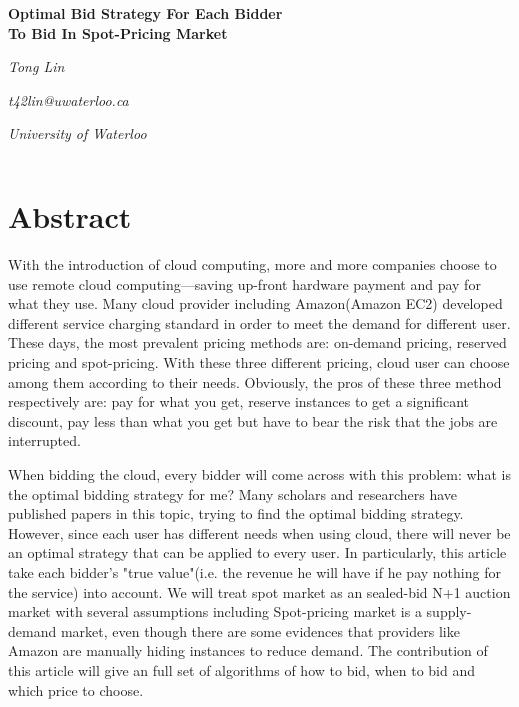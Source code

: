 \documentclass[11pt]{article}
\begin{document}
\begin{center}

{\large\bf Optimal Bid Strategy For Each Bidder\\ To Bid In Spot-Pricing Market}

\vspace{12pt}

{\em Tong Lin}

{\em t42lin@uwaterloo.ca}

{\em University of Waterloo}
\end{center}

$\ $

\section{Abstract}

With the introduction of cloud computing, more and more companies choose to use remote cloud computing---saving up-front hardware payment and pay for what they use. Many cloud provider including Amazon(Amazon EC2) developed different service charging standard in order to meet the demand for different user. These days, the most prevalent pricing methods are: on-demand pricing, reserved pricing and spot-pricing. With these three different pricing, cloud user can choose among them according to their needs. Obviously, the pros of these three method respectively are: pay for what you get, reserve instances to get a significant discount, pay less than what you get but have to bear the risk that the jobs are interrupted. 

When bidding the cloud, every bidder will come across with this problem: what is the optimal bidding strategy for me? Many scholars and researchers have published papers in this topic, trying to find the optimal bidding strategy. However, since each user has different needs when using cloud, there will never be an optimal strategy that can be applied to every user. In particularly, this article take each bidder's "true value"(i.e. the revenue he will have if he pay nothing for the service) into account. We will treat spot market as an sealed-bid N+1 auction market with several assumptions including Spot-pricing market is a supply-demand market, even though there are some evidences that providers like Amazon are manually hiding instances to reduce demand. The contribution of this article will give an full set of algorithms of how to bid, when to bid and which price to choose.
\end{document}
